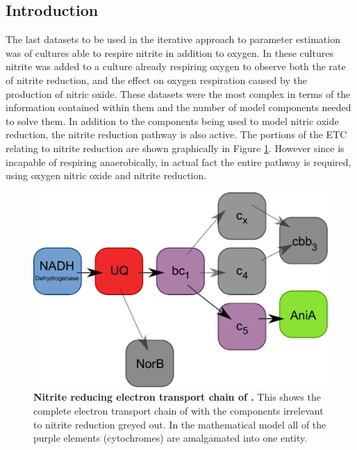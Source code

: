 \subsection{Introduction}

The last datasets to be used in the iterative approach to parameter estimation was of cultures able to respire nitrite in addition to oxygen. In these cultures nitrite was added to a culture already respiring oxygen to observe both the rate of nitrite reduction, and the effect on oxygen respiration caused by the production of nitric oxide. These datasets were the most complex in terms of the information contained within them and the number of model components needed to solve them. In addition to the components being used to model nitric oxide reduction, the nitrite reduction pathway is also active. The portions of the ETC relating to nitrite reduction are shown graphically in Figure \ref{fig:no2_resp_chain}. However since \Nsm{} is incapable of respiring anaerobically, in actual fact the entire pathway is required, using oxygen nitric oxide and nitrite reduction.
\begin{figure}[tbp]
  \centering
    \includegraphics[width=14cm]{07-nitritereduction/data/no2_resp_chain.pdf}
    \caption[Nitrite reducing electron transport chain of \Nm{}]{{\bf Nitrite reducing electron transport chain of \Nm{}.} This shows the complete electron transport chain of \Nsm{} with the components irrelevant to nitrite reduction greyed out. In the mathematical model all of the purple elements (cytochromes) are amalgamated into one entity.
  \label{fig:no2_resp_chain}}
\end{figure}

